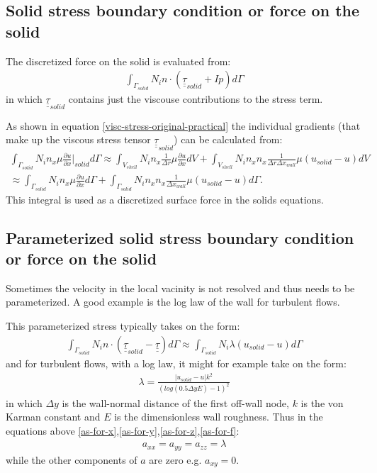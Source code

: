 \subsection{Solid stress boundary condition or force on the solid} 

The discretized force on the solid is evaluated from:
\begin{eqnarray}
\int_{\Gamma_{solid}} N_i n\cdot (\underline{\underline{\tau}}_{solid} + I p) d\Gamma
\end{eqnarray} 
in which $\underline{\underline{\tau}}_{solid}$ contains just the viscouse contributions 
to the stress term. 

As shown in equation \ref{visc-stress-original-practical}  the 
individual gradients (that make up the viscous stress tensor  $\underline{\underline{\tau}}_{solid}$) can be calculated from:
\begin{eqnarray}
\int_{\Gamma_{solid}}  N_i n_x \mu \frac{\partial u}{\partial x} \vert_{solid} d\Gamma
\approx 
\int_{V_{shell}}  N_i n_x \frac{1}{\Delta r}\mu \frac{\partial u}{\partial x}  dV
+
\int_{V_{shell}}  N_i n_x n_x \frac{1}{\Delta r \Delta x_{wall} }\mu (u_{solid} -u)  dV \\
\approx 
\int_{\Gamma_{solid}}  N_i n_x \mu \frac{\partial u}{\partial x}  d\Gamma
+
\int_{\Gamma_{solid}}  N_i n_x n_x \frac{1}{\Delta x_{wall}}\mu (u_{solid} -u)  d\Gamma. 
\label{visc-stress-original-practical-solid-bc} 
\end{eqnarray} 
This integral is used as a discretized surface force in the solids equations. 
 





\subsection{Parameterized solid stress boundary condition or force on the solid} 
Sometimes the velocity in the local vacinity is not resolved and thus 
needs to be parameterized. A good example is the log law of the wall for turbulent 
flows.  

This parameterized stress typically takes on the form:  
\begin{eqnarray}
\int_{\Gamma_{solid}} N_i n\cdot 
(  \underline{\underline{\tau}}_{solid} - \underline{\underline{\tau}} )
d\Gamma 
\approx
\int_{\Gamma_{solid}} N_i \lambda (u_{solid}-u)  d\Gamma 
\end{eqnarray} 
and for turbulent flows, with a log law, it might for example take on the form: 
\begin{eqnarray}
\lambda = \frac{ \vert u_{solid}-u\vert k^2 } { (log(0.5\Delta y E)-1)^2}  
\end{eqnarray} 
in which $\Delta y$ is the wall-normal distance
of the first off-wall node, $k$ is the von Karman constant and $E$ is the dimensionless wall roughness. 
Thus in the equations above \ref{as-for-x},\ref{as-for-y},\ref{as-for-z},\ref{as-for-f}: 
\begin{eqnarray}
a_{xx}=a_{yy}=a_{zz}=\lambda
\end{eqnarray} 
while the other components of $a$ are zero e.g. $a_{xy}=0$. 





